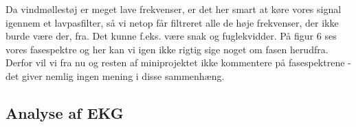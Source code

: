 \documentclass[12pt, letterpaper]{article}
\begin{document}
\begin{figure}[!h]
           \begin{floatrow}
       
           \end{floatrow}
\end{figure}

Da vindmøllestøj er meget lave frekvenser, er det her smart at køre vores signal igennem et lavpasfilter, så vi netop får filtreret alle de høje frekvenser, der ikke burde være der, fra. Det kunne f.eks. være snak og fuglekvidder. 
På figur 6 ses vores fasespektre og her kan vi igen ikke rigtig sige noget om fasen herudfra. Derfor vil vi fra nu og resten af miniprojektet ikke kommentere på fasespektrene - det giver nemlig ingen mening i disse sammenhæng. 

\newpage


\subsection{Analyse af EKG}
\end{document}
